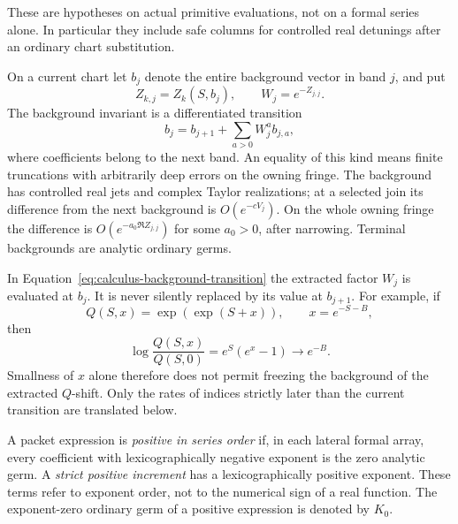 These are hypotheses on actual primitive evaluations, not on a formal
series alone.  In particular they include safe columns for controlled real
detunings after an ordinary chart substitution.

On a current chart let $b_j$ denote the entire background vector in band
$j$, and put
\begin{equation}
 Z_{k,j}=Z_k(S,b_j),\qquad W_j=e^{-Z_{j,j}}.
 \label{eq:calculus-current-symbol}
\end{equation}
The background invariant is a differentiated transition
\begin{equation}
 b_j=b_{j+1}+\sum_{a>0}W_j^a b_{j,a},
 \label{eq:calculus-background-transition}
\end{equation}
where coefficients belong to the next band.  An equality of this kind means
finite truncations with arbitrarily deep errors on the owning fringe.
The background has controlled real jets and complex Taylor realizations;
at a selected join its difference from the next background is
$O(e^{-cV_j})$.  On the whole owning fringe the difference is
$O(e^{-a_0\Re Z_{j,j}})$ for some $a_0>0$, after narrowing.  Terminal
backgrounds are analytic ordinary germs.

In Equation~\eqref{eq:calculus-background-transition} the extracted factor
$W_j$ is evaluated at $b_j$.  It is never silently replaced by its value at
$b_{j+1}$.  For example, if
\[
 Q(S,x)=\exp(\exp(S+x)),\qquad x=e^{-S-B},
\]
then
\[
 \log\frac{Q(S,x)}{Q(S,0)}
 =e^S(e^x-1)\longrightarrow e^{-B}.
\]
Smallness of $x$ alone therefore does not permit freezing the background of
the extracted $Q$-shift.  Only the rates of indices strictly later than the
current transition are translated below.

\begin{definition}
A packet expression is \emph{positive in series order} if, in each lateral
formal array, every coefficient with lexicographically negative exponent is
the zero analytic germ.  A \emph{strict positive increment} has a
lexicographically positive exponent.  These terms refer to exponent order,
not to the numerical sign of a real function.  The exponent-zero ordinary
germ of a positive expression is denoted by $K_0$.
\end{definition}

